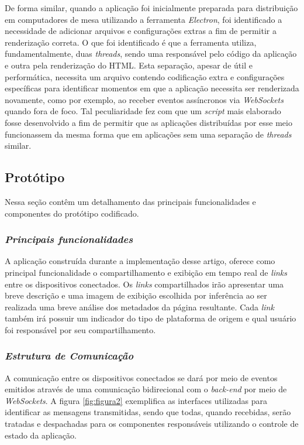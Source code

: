 De forma similar, quando a aplicação foi inicialmente preparada para distribuição em computadores de mesa utilizando a ferramenta \textit{Electron}, foi identificado a necessidade de adicionar arquivos e configurações extras a fim de permitir a renderização correta. O que foi identificado é que a ferramenta utiliza, fundamentalmente, duas \textit{threads}, sendo uma responsável pelo código da aplicação e outra pela renderização do HTML. Esta separação, apesar de útil e performática, necessita um arquivo contendo codificação extra e configurações específicas para identificar momentos em que a aplicação necessita ser renderizada novamente, como por exemplo, ao receber eventos assíncronos via \textit{WebSockets} quando fora de foco. Tal peculiaridade fez com que um \textit{script} mais elaborado fosse desenvolvido a fim de permitir que as aplicações distribuídas por esse meio funcionassem da mesma forma que em aplicações sem uma separação de \textit{threads} similar.

\subsection{Protótipo}

Nessa seção contêm um detalhamento das principais funcionalidades e componentes do protótipo codificado.

\subsubsection{{\it Principais funcionalidades}}

A aplicação construída durante a implementação desse artigo, oferece como principal funcionalidade o compartilhamento e exibição em tempo real de \textit{links} entre os dispositivos conectados.
Os \textit{links} compartilhados irão apresentar uma breve descrição e uma imagem de exibição escolhida por inferência ao ser realizada uma breve análise dos metadados da página resultante. Cada \textit{link} também irá possuir um indicador do tipo de plataforma de origem e qual usuário foi responsável por seu compartilhamento.

\subsubsection{{\it Estrutura de Comunicação}}

A comunicação entre os dispositivos conectados se dará por meio de eventos emitidos através de uma comunicação bidirecional com o \textit{back-end} por meio de \textit{WebSockets}. A figura \ref{fig:figura2} exemplifica as interfaces utilizadas para identificar as mensagens transmitidas, sendo que todas, quando recebidas, serão tratadas e despachadas para os componentes responsáveis utilizando o controle de estado da aplicação.

